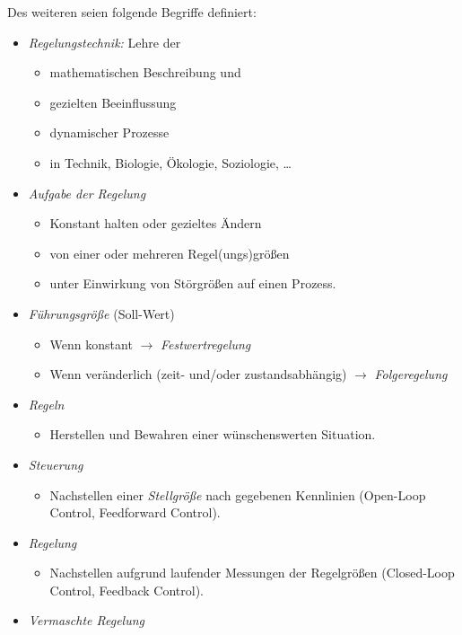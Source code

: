 			Des weiteren seien folgende Begriffe definiert:
			\begin{itemize}
				\item \emph{Regelungstechnik:} Lehre der
					\begin{itemize}
						\item mathematischen Beschreibung und
						\item gezielten Beeinflussung
						\item dynamischer Prozesse
						\item in Technik, Biologie, Ökologie, Soziologie, \dots
					\end{itemize}
				\item \emph{Aufgabe der Regelung}
					\begin{itemize}
						\item Konstant halten oder gezieltes Ändern
						\item von einer oder mehreren Regel(ungs)größen
						\item unter Einwirkung von Störgrößen auf einen Prozess.
					\end{itemize}
				\item \emph{Führungsgröße} (Soll-Wert)
					\begin{itemize}
						\item Wenn konstant \(\to\) \emph{Festwertregelung}
						\item Wenn veränderlich (zeit- und/oder zustandsabhängig) \(\to\) \emph{Folgeregelung}
					\end{itemize}
				\item \emph{Regeln}
					\begin{itemize}
						\item Herstellen und Bewahren einer wünschenswerten Situation.
					\end{itemize}
				\item \emph{Steuerung}
					\begin{itemize}
						\item Nachstellen einer \emph{Stellgröße} nach gegebenen Kennlinien (Open-Loop Control, Feedforward Control).
					\end{itemize}
				\item \emph{Regelung}
					\begin{itemize}
						\item Nachstellen aufgrund laufender Messungen der Regelgrößen (Closed-Loop Control, Feedback Control).
					\end{itemize}
				\item \emph{Vermaschte Regelung}

\end{itemize}

